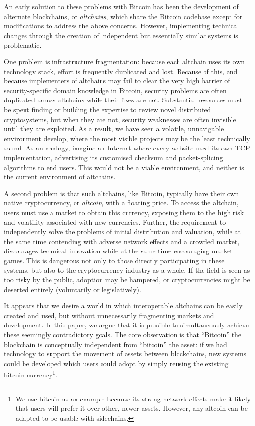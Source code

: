 \documentclass[letterpaper]{article}
\newcommand{\sidechains}{sidechains\xspace}
\newcommand{\altcoin}{altcoin\xspace}
\newcommand{\altchain}{altchain\xspace}
\newcommand{\altchains}{altchains\xspace}
\begin{document}
An early solution to these problems with Bitcoin has been the development of alternate
blockchains, or \emph{\altchains}, which share the Bitcoin codebase
except for modifications to address the above concerns. However,
implementing technical changes through the creation of independent but essentially
similar systems is problematic.

One problem is infrastructure fragmentation:
because each \altchain uses its own technology stack, effort is frequently duplicated and lost.
Because of this, and because implementers of \altchains may fail to clear the
very high barrier of security-specific domain knowledge in Bitcoin\cite{poelstra2014-1},
security problems are often duplicated across \altchains while their fixes are
not. Substantial resources must be spent finding or building the expertise to
review novel distributed cryptosystems, but when they are not, security weaknesses
are often invisible until they are exploited. As a result, we have seen a volatile, unnavigable environment develop, where the most visible projects
may be the least technically sound.
As an analogy, imagine an Internet where every website used its own TCP
implementation, advertising its customised checksum and packet-splicing
algorithms to end users. This would not be a viable environment, and neither is
the current environment of \altchains.

A second problem is that such \altchains, like Bitcoin, typically have their own native cryptocurrency, or \emph{\altcoin}, with a floating price. To access the \altchain, users must use a market to obtain this currency, exposing them to the
high risk and volatility associated with new currencies.
Further, the requirement to independently solve the problems of
initial distribution and
valuation, while at the same time contending with adverse network effects and
a crowded market, discourages technical innovation while at the same time encouraging market
games.
This is dangerous not only to those directly participating in these systems,
but also to the cryptocurrency industry as a whole. If the field is seen as
too risky by the public, adoption may be hampered, or 
cryptocurrencies might be deserted entirely (voluntarily or legislatively).

It appears that we desire a world in which interoperable \altchains can be easily
created and used, but without unnecessarily fragmenting markets and development.
In this paper, we argue that it is possible to simultaneously achieve these
seemingly contradictory goals.
The core observation is that ``Bitcoin'' the blockchain is conceptually
independent from ``bitcoin'' the asset: if we had technology to support
the movement of assets between blockchains, new
systems could be developed which users could adopt by simply reusing the
existing bitcoin currency\footnote{We use bitcoin as an example because its strong network effects
make it likely that users will prefer it over other, newer assets. However, any \altcoin can be
adapted to be usable with \sidechains.}.
\end{document}
